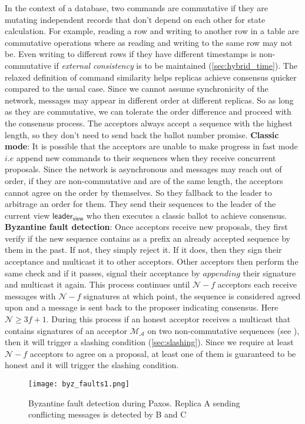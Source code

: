 In the context of a database, two commands are commutative if they are mutating independent records that don't depend on each other for state calculation. For example, reading a row and writing to another row in a table are commutative operations where as reading and writing to the same row may not be. Even writing to different rows if they have different timestamps is non-commutative if \textit{external consistency} is to be maintained (\cref{sec:hybrid_time}). The relaxed definition of command similarity helps replicas achieve consensus quicker compared to the usual case. Since we cannot assume synchronicity of the network, messages may appear in different order at different replicas. So as long as they are commutative, we can tolerate the order difference and proceed with the consensus process. The acceptors always accept a sequence with the highest length, so they don't need to send back the ballot number promise.
\newline\newline
\textbf{Classic mode}: It is possible that the acceptors are unable to make progress in fast mode $i.e$ append new commands to their sequences when they receive concurrent proposals. Since the network is asynchronous and messages may reach out of order, if they are non-commutative and are of the same length, the acceptors cannot agree on the order by themselves. So they fallback to the leader to arbitrage an order for them. They send their sequences to the leader of the current view $\textsf{leader}_\textsf{view}$ who then executes a classic ballot to achieve consensus.
\newline\newline
\textbf{Byzantine fault detection}: Once acceptors receive new proposals, they first verify if the new sequence contains as a prefix an already accepted sequence by them in the past. If not, they simply reject it. If it does, then they sign their acceptance and multicast it to other acceptors. Other acceptors then perform the same check and if it passes, signal their acceptance by $appending$ their signature and multicast it again. This process continues until $\mathcal{N} - f$ acceptors each receive messages with $\mathcal{N} - f$ signatures at which point, the sequence is considered agreed upon and a message is sent back to the proposer indicating consensus. Here $\mathcal{N} \ge 3f+1$. During this process if an honest acceptor receives a multicast that contains signatures of an acceptor $\mathcal{M_A}$ on two non-commutative sequences (see ), then it will trigger a slashing condition (\cref{sec:slashing}). Since we require at least $\mathcal{N} - f$ acceptors to agree on a proposal, at least one of them is guaranteed to be honest and it will trigger the slashing condition. 
\begin{figure}[h!] \centering
	\texttt{[image: byz\_faults1.png]}
	\caption{Byzantine fault detection during Paxos. Replica A sending conflicting messages is detected by B and C}
	\label{fig:byz_faults}
\end{figure}

